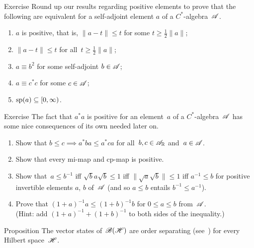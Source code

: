\documentclass[a]{subfiles}
\begin{document}
\begin{parsec}
\begin{point}{Exercise}%
%
Round up our results regarding positive elements
to 
prove that
the following are equivalent
for a self-adjoint element $a$ of a $C^*$-algebra~$\mathscr{A}$.
\begin{enumerate}
\item 
$a$ is positive, that is,  $\|a-t\|\leq t$
for some $t\geq \frac{1}{2}\|a\|$;
\item
$\|a-t\|\leq t$ for all~$t\geq \frac{1}{2}\|a\|$;
\item
$a\equiv b^2$ for some self-adjoint $b\in\mathscr{A}$;
\item
$a\equiv c^* c$ for some $c\in\mathscr{A}$;
\item
$\mathrm{sp}(a)\subseteq [0,\infty)$.
\end{enumerate}
\end{point}
\begin{point}{Exercise}%
The fact that $a^*a$ is positive
for an element~$a$ of a $C^*$-algebra~$\mathscr{A}$
has some nice consequences
of its own needed later on.
\begin{enumerate}
\item
Show that $b\leq c\implies a^*ba \leq a^*ca$
for all~$b,c\in\mathscr{A}_{\mathbb{R}}$ and~$a\in\mathscr{A}$.
\item
Show that every mi-map and cp-map is positive.
\item
Show that~$a\leq b^{-1}$ 
iff $\sqrt{b}a\sqrt{b}\leq 1$
iff $\|\sqrt{a}\sqrt{b}\|\leq 1$
iff $a^{-1}\leq b$
for positive invertible elements $a$, $b$ of~$\mathscr{A}$
(and so $a\leq b$ entails $b^{-1}\leq a^{-1}$).
\item
Prove that $(1+a)^{-1}a\leq (1+b)^{-1}b$
for $0\leq a\leq b$ from~$\mathscr{A}$.\\
(Hint: add $(1+a)^{-1} + (1+b)^{-1}$
to both sides of the inequality.)
\end{enumerate}
\end{point}
\begin{point}{Proposition}%
The vector states
of~$\mathscr{B}(\mathscr{H})$
are order separating (see~)
for every Hilbert space~$\mathscr{H}$.
\end{point}
\end{parsec}
\end{document}
